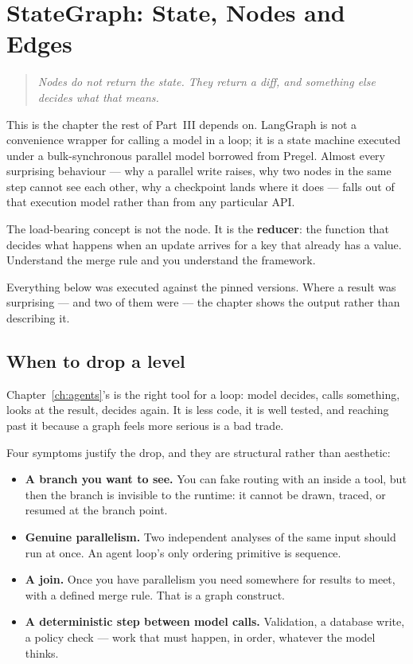 \chapter{StateGraph: State, Nodes and Edges}
\label{ch:stategraph}

\begin{quote}\itshape
Nodes do not return the state. They return a diff, and something else decides
what that means.
\end{quote}

\noindent
This is the chapter the rest of Part~III depends on. LangGraph is not a
convenience wrapper for calling a model in a loop; it is a state machine executed
under a bulk-synchronous parallel model borrowed from Pregel. Almost every
surprising behaviour --- why a parallel write raises, why two nodes in the same
step cannot see each other, why a checkpoint lands where it does --- falls out of
that execution model rather than from any particular API.

The load-bearing concept is not the node. It is the \textbf{reducer}: the
function that decides what happens when an update arrives for a key that already
has a value. Understand the merge rule and you understand the framework.

Everything below was executed against the pinned versions. Where a result was
surprising --- and two of them were --- the chapter shows the output rather than
describing it.

\section{When to drop a level}
\label{sec:when-stategraph}

Chapter~\ref{ch:agents}'s  is the right tool for a loop:
model decides, calls something, looks at the result, decides again. It is less
code, it is well tested, and reaching past it because a graph feels more serious
is a bad trade.

Four symptoms justify the drop, and they are structural rather than aesthetic:

\begin{itemize}[leftmargin=1.4em]
\item \textbf{A branch you want to see.} You can fake routing with an 
      inside a tool, but then the branch is invisible to the runtime: it cannot
      be drawn, traced, or resumed at the branch point.
\item \textbf{Genuine parallelism.} Two independent analyses of the same input
      should run at once. An agent loop's only ordering primitive is sequence.
\item \textbf{A join.} Once you have parallelism you need somewhere for results
      to meet, with a defined merge rule. That is a graph construct.
\item \textbf{A deterministic step between model calls.} Validation, a database
      write, a policy check --- work that must happen, in order, whatever the
      model thinks.
\end{itemize}

